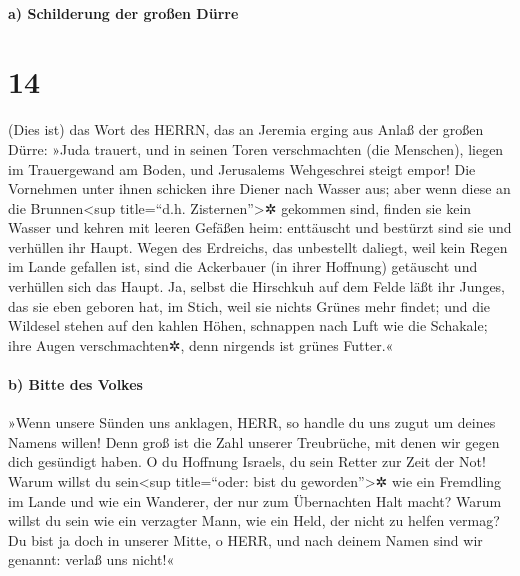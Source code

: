 \hypertarget{a-schilderung-der-grouxdfen-duxfcrre}{%
\paragraph{a) Schilderung der großen
Dürre}\label{a-schilderung-der-grouxdfen-duxfcrre}}

\hypertarget{section-13}{%
\section{14}\label{section-13}}

(Dies ist) das Wort des HERRN, das an Jeremia erging aus
Anlaß der großen Dürre: »Juda trauert, und in seinen Toren
verschmachten (die Menschen), liegen im Trauergewand am Boden, und
Jerusalems Wehgeschrei steigt empor! Die Vornehmen unter
ihnen schicken ihre Diener nach Wasser aus; aber wenn diese an die
Brunnen\textless sup title=``d.h. Zisternen''\textgreater✲ gekommen
sind, finden sie kein Wasser und kehren mit leeren Gefäßen heim:
enttäuscht und bestürzt sind sie und verhüllen ihr Haupt.
Wegen des Erdreichs, das unbestellt daliegt, weil kein
Regen im Lande gefallen ist, sind die Ackerbauer (in ihrer Hoffnung)
getäuscht und verhüllen sich das Haupt. Ja, selbst die
Hirschkuh auf dem Felde läßt ihr Junges, das sie eben geboren hat, im
Stich, weil sie nichts Grünes mehr findet; und die
Wildesel stehen auf den kahlen Höhen, schnappen nach Luft wie die
Schakale; ihre Augen verschmachten✲, denn nirgends ist grünes Futter.«

\hypertarget{b-bitte-des-volkes}{%
\paragraph{b) Bitte des Volkes}\label{b-bitte-des-volkes}}

»Wenn unsere Sünden uns anklagen, HERR, so handle du uns
zugut um deines Namens willen! Denn groß ist die Zahl unserer
Treubrüche, mit denen wir gegen dich gesündigt haben. O du
Hoffnung Israels, du sein Retter zur Zeit der Not! Warum willst du
sein\textless sup title=``oder: bist du geworden''\textgreater✲ wie ein
Fremdling im Lande und wie ein Wanderer, der nur zum Übernachten Halt
macht? Warum willst du sein wie ein verzagter Mann, wie
ein Held, der nicht zu helfen vermag? Du bist ja doch in unserer Mitte,
o HERR, und nach deinem Namen sind wir genannt: verlaß uns nicht!«

